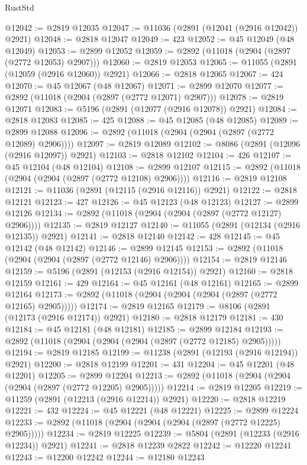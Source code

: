\begin{lexlean}{RustStd}
\begin{coremodule}
@12042 := @2819 @12035
@12047 := @11036 (@2891 (@12041 (@2916 @12042)) @2921)
@12048 := @2818 @12047
@12049 := 423
@12052 := @45 @12049 (@48 @12049)
@12053 := @2899 @12052
@12059 := @2892 (@11018 (@2904 (@2897 (@2772 @12053) @2907)))
@12060 := @2819 @12053
@12065 := @11055 (@2891 (@12059 (@2916 @12060)) @2921)
@12066 := @2818 @12065
@12067 := 424
@12070 := @45 @12067 (@48 @12067)
@12071 := @2899 @12070
@12077 := @2892 (@11018 (@2904 (@2897 (@2772 @12071) @2907)))
@12078 := @2819 @12071
@12083 := @5196 (@2891 (@12077 (@2916 @12078)) @2921)
@12084 := @2818 @12083
@12085 := 425
@12088 := @45 @12085 (@48 @12085)
@12089 := @2899 @12088
@12096 := @2892 (@11018 (@2904 (@2904 (@2897 (@2772 @12089) @2906))))
@12097 := @2819 @12089
@12102 := @8086 (@2891 (@12096 (@2916 @12097)) @2921)
@12103 := @2818 @12102
@12104 := 426
@12107 := @45 @12104 (@48 @12104)
@12108 := @2899 @12107
@12115 := @2892 (@11018 (@2904 (@2904 (@2897 (@2772 @12108) @2906))))
@12116 := @2819 @12108
@12121 := @11036 (@2891 (@12115 (@2916 @12116)) @2921)
@12122 := @2818 @12121
@12123 := 427
@12126 := @45 @12123 (@48 @12123)
@12127 := @2899 @12126
@12134 := @2892 (@11018 (@2904 (@2904 (@2897 (@2772 @12127) @2906))))
@12135 := @2819 @12127
@12140 := @11055 (@2891 (@12134 (@2916 @12135)) @2921)
@12141 := @2818 @12140
@12142 := 428
@12145 := @45 @12142 (@48 @12142)
@12146 := @2899 @12145
@12153 := @2892 (@11018 (@2904 (@2904 (@2897 (@2772 @12146) @2906))))
@12154 := @2819 @12146
@12159 := @5196 (@2891 (@12153 (@2916 @12154)) @2921)
@12160 := @2818 @12159
@12161 := 429
@12164 := @45 @12161 (@48 @12161)
@12165 := @2899 @12164
@12173 := @2892 (@11018 (@2904 (@2904 (@2904 (@2897 (@2772 @12165) @2905)))))
@12174 := @2819 @12165
@12179 := @8106 (@2891 (@12173 (@2916 @12174)) @2921)
@12180 := @2818 @12179
@12181 := 430
@12184 := @45 @12181 (@48 @12181)
@12185 := @2899 @12184
@12193 := @2892 (@11018 (@2904 (@2904 (@2904 (@2897 (@2772 @12185) @2905)))))
@12194 := @2819 @12185
@12199 := @11238 (@2891 (@12193 (@2916 @12194)) @2921)
@12200 := @2818 @12199
@12201 := 431
@12204 := @45 @12201 (@48 @12201)
@12205 := @2899 @12204
@12213 := @2892 (@11018 (@2904 (@2904 (@2904 (@2897 (@2772 @12205) @2905)))))
@12214 := @2819 @12205
@12219 := @11259 (@2891 (@12213 (@2916 @12214)) @2921)
@12220 := @2818 @12219
@12221 := 432
@12224 := @45 @12221 (@48 @12221)
@12225 := @2899 @12224
@12233 := @2892 (@11018 (@2904 (@2904 (@2904 (@2897 (@2772 @12225) @2905)))))
@12234 := @2819 @12225
@12239 := @5804 (@2891 (@12233 (@2916 @12234)) @2921)
@12241 := @2818 @12239 @2822
@12242 := @12220 @12241
@12243 := @12200 @12242
@12244 := @12180 @12243

\end{coremodule}
\end{lexlean}
